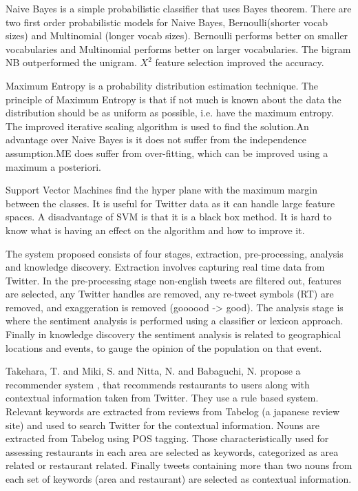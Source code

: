 Naive Bayes is a simple probabilistic classifier that uses Bayes theorem. There are two first order probabilistic models for Naive Bayes, Bernoulli(shorter vocab sizes) and Multinomial (longer vocab sizes). Bernoulli performs better on smaller vocabularies and Multinomial performs better on larger vocabularies. The bigram NB outperformed the unigram. ${X}^2$ feature selection improved the accuracy.

Maximum Entropy is a probability distribution estimation technique. The principle of Maximum Entropy is that if not much is known about the data the distribution should be as uniform as possible, i.e. have the maximum entropy. The improved iterative scaling algorithm is used to find the solution.An advantage over Naive Bayes is it does not suffer from the independence assumption.ME does suffer from over-fitting, which can be improved using  a maximum a posteriori.

Support Vector Machines find the hyper plane with the maximum margin between the classes. It is useful for Twitter data as it can handle large feature spaces. A disadvantage of SVM is that it is a black box method. It is hard to know what is having an effect on the algorithm and how to improve it.

The system proposed consists of four stages, extraction, pre-processing, analysis and knowledge discovery. Extraction involves capturing real time data from Twitter. In the pre-processing stage non-english tweets are filtered out, features are selected, any Twitter handles are removed, any re-tweet symbols (RT) are removed, and exaggeration is removed (goooood -> good). The analysis stage is where the sentiment analysis is performed using a classifier or lexicon approach. Finally in knowledge discovery the sentiment analysis is related to geographical locations and events, to gauge the opinion of the population on that event.

Takehara, T. and Miki, S. and Nitta, N. and Babaguchi, N. propose a recommender system \cite{takeharaContext2012}, that recommends restaurants to users along with contextual information taken from Twitter. They use a rule based system. Relevant keywords are extracted from reviews from Tabelog (a japanese review site) and used to search Twitter for the contextual information. Nouns are extracted from Tabelog using POS tagging. Those characteristically used for assessing restaurants in each area are selected as keywords, categorized as area related or restaurant related. Finally tweets containing more than two nouns from each set of keywords (area and restaurant) are selected as contextual information.



